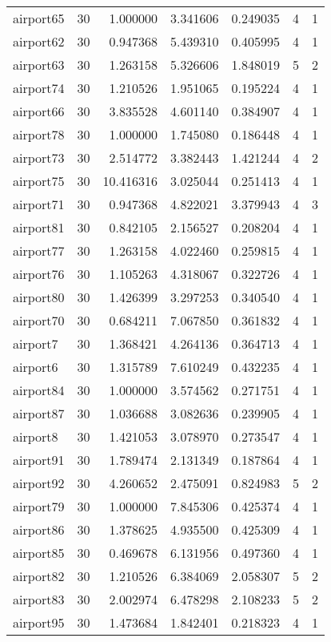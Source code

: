 \begin{longtable}{|l|r|r|r|r|r|r|}
airport65 & 30 & 1.000000 & 3.341606 & 0.249035 & 4 & 1 \\
airport62 & 30 & 0.947368 & 5.439310 & 0.405995 & 4 & 1 \\
airport63 & 30 & 1.263158 & 5.326606 & 1.848019 & 5 & 2 \\
airport74 & 30 & 1.210526 & 1.951065 & 0.195224 & 4 & 1 \\
airport66 & 30 & 3.835528 & 4.601140 & 0.384907 & 4 & 1 \\
airport78 & 30 & 1.000000 & 1.745080 & 0.186448 & 4 & 1 \\
airport73 & 30 & 2.514772 & 3.382443 & 1.421244 & 4 & 2 \\
airport75 & 30 & 10.416316 & 3.025044 & 0.251413 & 4 & 1 \\
airport71 & 30 & 0.947368 & 4.822021 & 3.379943 & 4 & 3 \\
airport81 & 30 & 0.842105 & 2.156527 & 0.208204 & 4 & 1 \\
airport77 & 30 & 1.263158 & 4.022460 & 0.259815 & 4 & 1 \\
airport76 & 30 & 1.105263 & 4.318067 & 0.322726 & 4 & 1 \\
airport80 & 30 & 1.426399 & 3.297253 & 0.340540 & 4 & 1 \\
airport70 & 30 & 0.684211 & 7.067850 & 0.361832 & 4 & 1 \\
airport7 & 30 & 1.368421 & 4.264136 & 0.364713 & 4 & 1 \\
airport6 & 30 & 1.315789 & 7.610249 & 0.432235 & 4 & 1 \\
airport84 & 30 & 1.000000 & 3.574562 & 0.271751 & 4 & 1 \\
airport87 & 30 & 1.036688 & 3.082636 & 0.239905 & 4 & 1 \\
airport8 & 30 & 1.421053 & 3.078970 & 0.273547 & 4 & 1 \\
airport91 & 30 & 1.789474 & 2.131349 & 0.187864 & 4 & 1 \\
airport92 & 30 & 4.260652 & 2.475091 & 0.824983 & 5 & 2 \\
airport79 & 30 & 1.000000 & 7.845306 & 0.425374 & 4 & 1 \\
airport86 & 30 & 1.378625 & 4.935500 & 0.425309 & 4 & 1 \\
airport85 & 30 & 0.469678 & 6.131956 & 0.497360 & 4 & 1 \\
airport82 & 30 & 1.210526 & 6.384069 & 2.058307 & 5 & 2 \\
airport83 & 30 & 2.002974 & 6.478298 & 2.108233 & 5 & 2 \\
airport95 & 30 & 1.473684 & 1.842401 & 0.218323 & 4 & 1 \\

\end{longtable}
